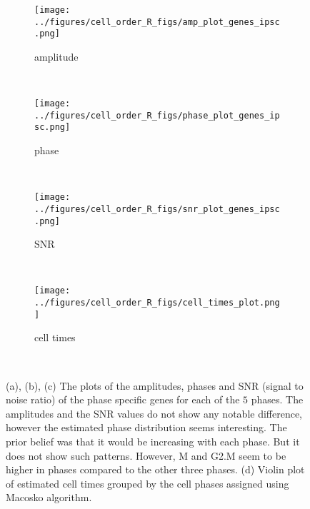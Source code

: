 \documentclass[11pt]{article}
\begin{document}
 \begin{figure*}[ht]
    \centering
     \begin{subfigure}[t]{0.5\textwidth}
        \centering
        \texttt{[image: ../figures/cell\_order\_R\_figs/amp\_plot\_genes\_ipsc.png]}
        \caption{amplitude}
    \end{subfigure}%
    ~
    \begin{subfigure}[t]{0.5\textwidth}
        \centering
        \texttt{[image: ../figures/cell\_order\_R\_figs/phase\_plot\_genes\_ipsc.png]}
        \caption{phase}
    \end{subfigure}\\

     \begin{subfigure}[t]{0.5\textwidth}
        \centering
        \texttt{[image: ../figures/cell\_order\_R\_figs/snr\_plot\_genes\_ipsc.png]}
        \caption{SNR}
    \end{subfigure}%
    ~
       \begin{subfigure}[t]{0.5\textwidth}
        \centering
        \texttt{[image: ../figures/cell\_order\_R\_figs/cell\_times\_plot.png]}
        \caption{cell times}
    \end{subfigure}\\

    \caption{(a), (b), (c) The plots of the amplitudes, phases and SNR (signal to noise ratio) of the phase specific genes for each of the $5$ phases. The amplitudes and the SNR values do not show any notable difference, however the estimated phase distribution seems interesting. The prior belief was that it would be increasing with each phase. But it does not show such patterns. However, M and G2.M seem to be higher in phases compared to the other three phases. (d) Violin plot of estimated cell times grouped by the cell phases assigned using Macosko algorithm.}
 \label{fig:fig4}
 \end{figure*}
\end{document}
